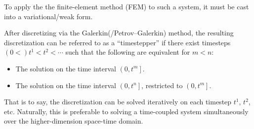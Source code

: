     To apply the the finite-element method (FEM) to such a system, it must be cast into a variational/weak form.
    
    After discretizing via the Galerkin(/Petrov–Galerkin) method, the resulting discretization can be referred to as a ``timestepper'' if there exist timesteps $(0  <)  t^{1}  <  t^{2}  <  \cdots$ such that the following are equivalent for $m  <  n$:
    \begin{itemize}
        \item  The solution on the time interval $\left(0, t^{m}\right]$.
        \item  The solution on the time interval $\left(0, t^{n}\right]$, restricted to $\left(0, t^{m}\right]$.
    \end{itemize}
    That is to say, the discretization can be solved iteratively on each timestep $t^{1}$, $t^{2}$, etc. Naturally, this is preferable to solving a time-coupled system simultaneously over the higher-dimension space-time domain.




    
    
